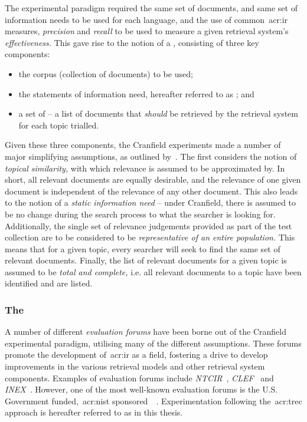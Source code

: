 The experimental paradigm required the same set of documents, and same set of information needs to be used for each language, and the use of common~\gls{acr:ir} measures, \emph{precision} and \emph{recall}  to be used to measure a given retrieval system's \emph{effectiveness.} This gave rise to the notion of a , consisting of three key components:

\begin{itemize}
    \item{the corpus (collection of documents) to be used;}
    \item{the statements of information need, hereafter referred to as ; and}
    \item{a set of  -- a list of documents that \emph{should} be retrieved by the retrieval system for each topic trialled.}
\end{itemize}

Given these three components, the Cranfield experiments made a number of major simplifying assumptions, as outlined by~\cite{voorhees2001iir_philosophy}. The first considers the notion of \emph{topical similarity,} with which relevance is assumed to be approximated by. In short, all relevant documents are equally desirable, and the relevance of one given document is independent of the relevance of any other document. This also leads to the notion of a \emph{static information need} -- under Cranfield, there is assumed to be no change during the search process to what the searcher is looking for. Additionally, the single set of relevance judgements provided as part of the test collection are to be considered to be \emph{representative of an entire population.} This means that for a given topic, every searcher will seek to find the same set of relevant documents. Finally, the list of relevant documents for a given topic is assumed to be \emph{total and complete,} i.e. all relevant documents to a topic have been identified and are listed.

\subsubsection{The~}\label{sec:ir_background:paradigms:trec}
A number of different \emph{evaluation forums} have been borne out of the Cranfield experimental paradigm, utilising many of the different assumptions. These forums promote the development of~\gls{acr:ir} as a field, fostering a drive to develop improvements in the various retrieval models and other retrieval system components. Examples of evaluation forums include \emph{NTCIR}~\citep{kando1999ntcir}, \emph{CLEF}~\citep{braschler2001clef} and \emph{INEX}~\citep{fuhr2006advances}. However, one of the most well-known evaluation forums is the U.S. Government funded,~\gls{acr:nist} sponsored~~\citep{harman1993trec1}. Experimentation following the~\gls{acr:trec} approach is hereafter referred to as  in this thesis.

